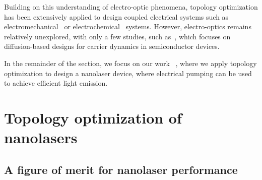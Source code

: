 Building on this understanding of electro-optic phenomena, topology optimization has been extensively applied to design coupled electrical systems such as electromechanical~\cite{MEMS_multi,electrostatic_act} or electrochemical~\cite{electrode} systems. However, electro-optics remains relatively unexplored, with only a few studies, such as~\cite{g_heat}, which focuses on diffusion-based designs for carrier dynamics in semiconductor devices.

In the remainder of the section, we focus on our work~\cite{ownpub4} , where we apply topology 
optimization to design a nanolaser device, where electrical pumping can be used to achieve efficient light emission.

\section{Topology optimization of nanolasers~\cite{ownpub4}}\label{sec:laser}

\subsection*{A figure of merit for nanolaser performance}

